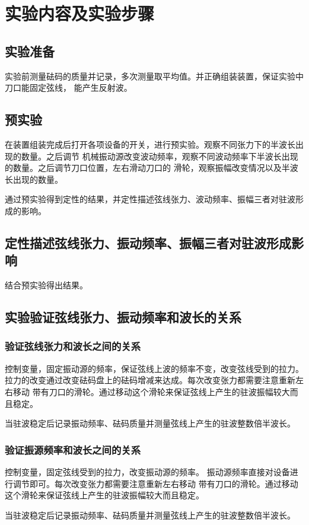 \documentclass{ctexart}
\begin{document}
\section{实验内容及实验步骤}
  \subsection{实验准备}
  实验前测量砝码的质量并记录，多次测量取平均值。并正确组装装置，保证实验中刀口能固定弦线，
  能产生反射波。
  \subsection{预实验}
  在装置组装完成后打开各项设备的开关，进行预实验。观察不同张力下的半波长出现的数量。之后调节
  机械振动源改变波动频率，观察不同波动频率下半波长出现的数量。之后调节刀口位置，左右滑动刀口的
  滑轮，观察振幅改变情况以及半波长出现的数量。

  通过预实验得到定性的结果，并定性描述弦线张力、波动频率、振幅三者对驻波形成的影响。
  \subsection{定性描述弦线张力、振动频率、振幅三者对驻波形成影响}
  结合预实验得出结果。
  \subsection{实验验证弦线张力、振动频率和波长的关系}
    \subsubsection{验证弦线张力和波长之间的关系}
    控制变量，固定振动源的频率，保证弦线上波的频率不变，改变弦线受到的拉力。
    拉力的改变通过改变砝码盘上的砝码增减来达成。每次改变张力都需要注意重新左右移动
    带有刀口的滑轮。通过移动这个滑轮来保证弦线上产生的驻波振幅较大而且稳定。

    当驻波稳定后记录振动频率、砝码质量并测量弦线上产生的驻波整数倍半波长。
    \subsubsection{验证振源频率和波长之间的关系}
    控制变量，固定弦线受到的拉力，改变振动源的频率。
    振动源频率直接对设备进行调节即可。每次改变张力都需要注意重新左右移动
    带有刀口的滑轮。通过移动这个滑轮来保证弦线上产生的驻波振幅较大而且稳定。

    当驻波稳定后记录振动频率、砝码质量并测量弦线上产生的驻波整数倍半波长。
\end{document}
